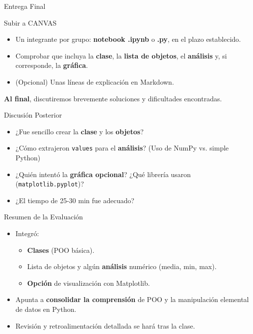 \documentclass[10pt]{beamer}
\begin{document}
\begin{frame}{Entrega Final}
  \begin{block}{Subir a CANVAS}
    \begin{itemize}
      \item Un integrante por grupo: \textbf{notebook .ipynb} o \textbf{.py}, en el plazo establecido.
      \item Comprobar que incluya la \textbf{clase}, la \textbf{lista de objetos}, el \textbf{análisis} y, si corresponde, la \textbf{gráfica}.
      \item (Opcional) Unas líneas de explicación en Markdown.
    \end{itemize}
  \end{block}
  \vspace{0.3cm}
  \textbf{Al final}, discutiremos brevemente soluciones y dificultades encontradas.
\end{frame}

\begin{frame}{Discusión Posterior}
  \begin{itemize}
    \item ¿Fue sencillo crear la \textbf{clase} y los \textbf{objetos}?
    \item ¿Cómo extrajeron \texttt{values} para el \textbf{análisis}? (Uso de NumPy vs. simple Python)
    \item ¿Quién intentó la \textbf{gráfica opcional}? ¿Qué librería usaron (\texttt{matplotlib.pyplot})?
    \item ¿El tiempo de 25-30 min fue adecuado?
  \end{itemize}
\end{frame}

\begin{frame}{Resumen de la Evaluación}
  \begin{itemize}
    \item Integró:
      \begin{itemize}
        \item \textbf{Clases} (POO básica).
        \item Lista de objetos y algún \textbf{análisis} numérico (media, min, max).
        \item \textbf{Opción} de visualización con Matplotlib.
      \end{itemize}
    \item Apunta a \textbf{consolidar la comprensión} de POO y la manipulación elemental de datos en Python.
    \item Revisión y retroalimentación detallada se hará tras la clase.
  \end{itemize}
\end{frame}
\end{document}
